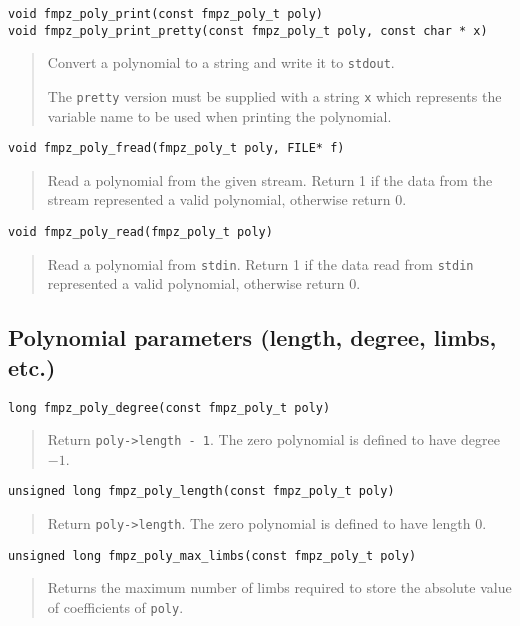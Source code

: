 \documentclass[a4paper,10pt]{article}
\newcommand{\code}{\lstinline}
\begin{document}
\begin{lstlisting}
void fmpz_poly_print(const fmpz_poly_t poly)
void fmpz_poly_print_pretty(const fmpz_poly_t poly, const char * x)
\end{lstlisting}
\begin{quote}
Convert a polynomial to a string and write it to \code{stdout}. 

The \code{pretty} version must be supplied with a string \code{x} which represents the variable name to be used when printing the polynomial.
\end{quote}

\begin{lstlisting}
void fmpz_poly_fread(fmpz_poly_t poly, FILE* f)
\end{lstlisting}
\begin{quote}
Read a polynomial from the given stream. Return 1 if the data from the stream represented a valid polynomial, otherwise return 0.
\end{quote}

\begin{lstlisting}
void fmpz_poly_read(fmpz_poly_t poly)
\end{lstlisting}
\begin{quote}
Read a polynomial from \code{stdin}. Return 1 if the data read from \code{stdin} represented a valid polynomial, otherwise return 0.
\end{quote}

\subsection{Polynomial parameters (length, degree, limbs, etc.)}

\begin{lstlisting}
long fmpz_poly_degree(const fmpz_poly_t poly)
\end{lstlisting}
\begin{quote}
Return \code{poly->length - 1}. The zero polynomial is defined to have degree $-1$.
\end{quote}

\begin{lstlisting}
unsigned long fmpz_poly_length(const fmpz_poly_t poly)
\end{lstlisting}
\begin{quote}
Return \code{poly->length}. The zero polynomial is defined to have length $0$.
\end{quote}

\begin{lstlisting}
unsigned long fmpz_poly_max_limbs(const fmpz_poly_t poly)
\end{lstlisting}
\begin{quote}
Returns the maximum number of limbs required to store the absolute value of coefficients of \code{poly}. \end{quote}
\end{document}
